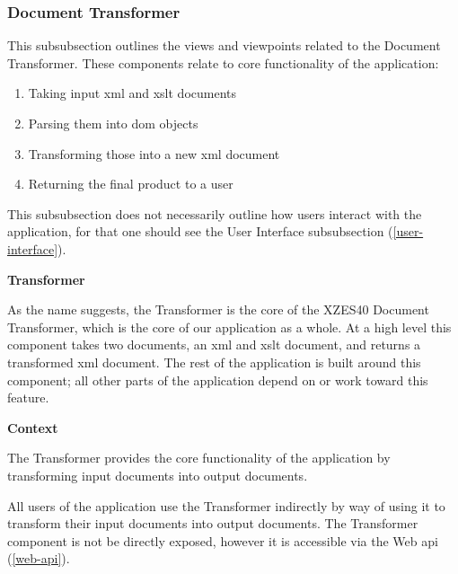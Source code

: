 \subsubsection{Document Transformer}
\label{document-transformer}

This subsubsection outlines the views and viewpoints related to the Document Transformer.
These components relate to core functionality of the application:

\begin{enumerate}
  \item Taking input \gls{xml} and \gls{xslt} documents
  \item Parsing them into \gls{dom} objects
  \item Transforming those into a new \gls{xml} document
  \item Returning the final product to a user
\end{enumerate}

This subsubsection does not necessarily outline how users interact with the application, for that one should see the User Interface subsubsection (\ref{user-interface}).

\textbf{Transformer}
\label{transformer}

As the name suggests, the Transformer is the core of the XZES40 Document Transformer, which is the core of our application as a whole.
At a high level this component takes two documents, an \gls{xml} and \gls{xslt} document, and returns a transformed \gls{xml} document.
The rest of the application is built around this component; all other parts of the application depend on or work toward this feature.

\textbf{Context}

The Transformer provides the core functionality of the application by transforming input documents into output documents.

All users of the application use the Transformer indirectly by way of using it to transform their input documents into output documents.
The Transformer component is not be directly exposed, however it is accessible via the Web \gls{api} (\ref{web-api}).

